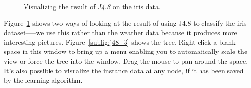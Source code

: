 \begin{figure}[!th]
\centering
{}
\newline
{}
\caption{\label{fig:j48_iris}Visualizing the result of \textit{J4.8} on the iris data.}
\end{figure}

Figure~\ref{fig:j48_iris} shows two ways of looking at the result of
using J4.8 to classify the iris dataset--—we use this rather than the
weather data because it produces more interesting
pictures. Figure~\ref{subfig:j48_3} shows the tree. Right-click a
blank space in this window to bring up a menu enabling you to
automatically scale the view or force the tree into the window. Drag
the mouse to pan around the space. It's also possible to visualize the
instance data at any node, if it has been saved by the learning
algorithm.

